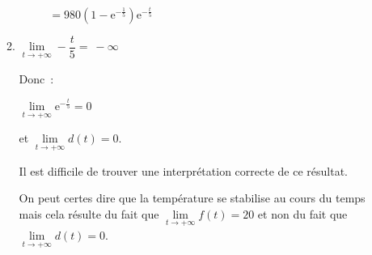 \begin{corrige}
\begin{enumerate}
\begin{enumerate}[label=\alph*.]
               $\phantom{d(t)} = 980\left(1 -\text{e}^{-\frac{1}{5}}\right)\text{e}^{-\frac{t}{5}}$
               \item
               $\lim\limits_{t \rightarrow +\infty} -\dfrac{t}{5}=~-\infty$
               \par
               Donc~:
               \par
               $\lim\limits_{t \rightarrow +\infty} \text{e}^{-\frac{t}{5}} = 0$
               \par
               et $\lim\limits_{t \rightarrow +\infty} d(t)=0$.
               \par
               Il est difficile de trouver une interprétation correcte de ce résultat.
               \par
               On peut certes dire que la température se stabilise au cours du temps mais cela résulte du fait que $\lim\limits_{t \rightarrow +\infty} f(t)=20$ et non du fait que  $\lim\limits_{t \rightarrow +\infty} d(t)=0$.
          \end{enumerate}
     \end{enumerate}
\end{corrige}
